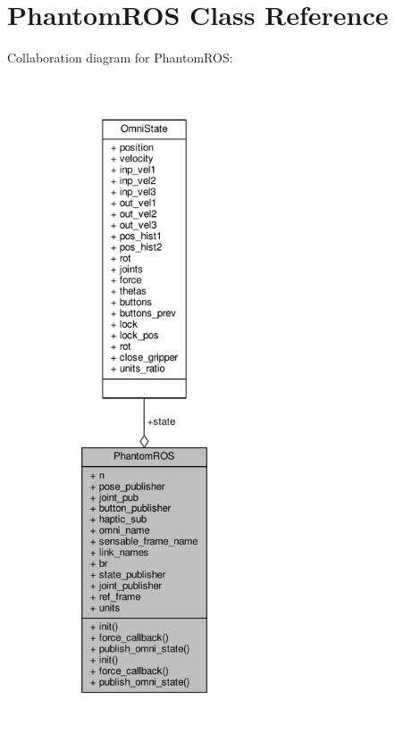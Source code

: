 \hypertarget{class_phantom_r_o_s}{\section{Phantom\-R\-O\-S Class Reference}
\label{class_phantom_r_o_s}
}


Collaboration diagram for Phantom\-R\-O\-S\-:
\nopagebreak
\begin{figure}[H]
\begin{center}
\leavevmode
\includegraphics[height=550pt]{class_phantom_r_o_s__coll__graph}
\end{center}
\end{figure}
